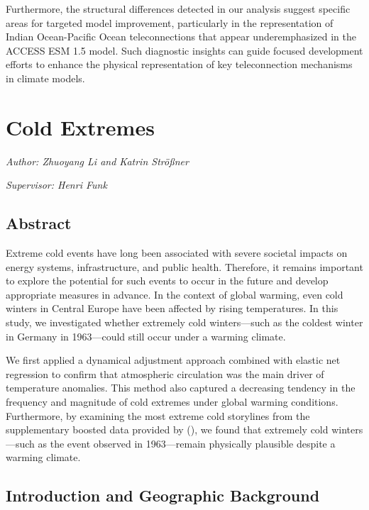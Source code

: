 \documentclass[
]{krantz}
\begin{document}
Furthermore, the structural differences detected in our analysis suggest specific areas for targeted model improvement, particularly in the representation of Indian Ocean-Pacific Ocean teleconnections that appear underemphasized in the ACCESS ESM 1.5 model. Such diagnostic insights can guide focused development efforts to enhance the physical representation of key teleconnection mechanisms in climate models.

\chapter{Cold Extremes}\label{ce}

\emph{Author: Zhuoyang Li and Katrin Strößner}

\emph{Supervisor: Henri Funk }

\section{Abstract}\label{abstract-2}

Extreme cold events have long been associated with severe societal impacts on energy systems, infrastructure, and public health. Therefore, it remains important to explore the potential for such events to occur in the future and develop appropriate measures in advance. In the context of global warming, even cold winters in Central Europe have been affected by rising temperatures. In this study, we investigated whether extremely cold winters---such as the coldest winter in Germany in 1963---could still occur under a warming climate.

We first applied a dynamical adjustment approach combined with elastic net regression to confirm that atmospheric circulation was the main driver of temperature anomalies. This method also captured a decreasing tendency in the frequency and magnitude of cold extremes under global warming conditions. Furthermore, by examining the most extreme cold storylines from the supplementary boosted data provided by (\citet{sippel2024}), we found that extremely cold winters---such as the event observed in 1963---remain physically plausible despite a warming climate.

\section{Introduction and Geographic Background}\label{introduction-and-geographic-background}
\end{document}
